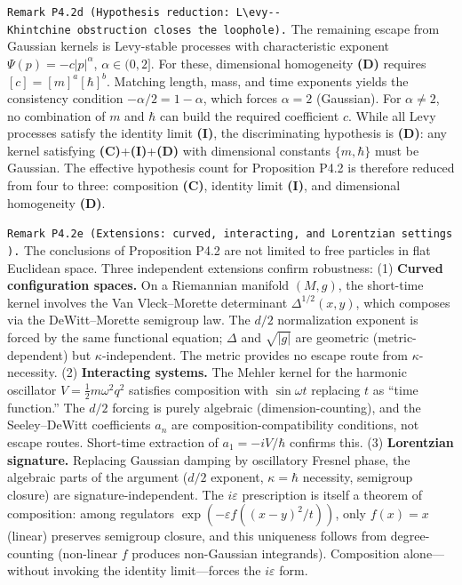 \documentclass[
]{article}
\begin{document}
\texttt{Remark\ P4.2d\ (Hypothesis\ reduction:\ L\textbackslash{}\textquotesingle{}evy-\/-Khintchine\ obstruction\ closes\ the\ loophole).}
The remaining escape from Gaussian kernels is
L\textquotesingle evy-stable processes with characteristic exponent
\(\Psi(p)=-c|p|^\alpha\), \(\alpha\in(0,2]\). For these, dimensional
homogeneity \textbf{(D)} requires \([c]=[m]^a[\hbar]^b\). Matching
length, mass, and time exponents yields the consistency condition
\(-\alpha/2=1-\alpha\), which forces \(\alpha=2\) (Gaussian). For
\(\alpha\neq 2\), no combination of \(m\) and \(\hbar\) can build the
required coefficient \(c\). While all L\textquotesingle evy processes
satisfy the identity limit \textbf{(I)}, the discriminating hypothesis
is \textbf{(D)}: any kernel satisfying
\textbf{(C)}+\textbf{(I)}+\textbf{(D)} with dimensional constants
\(\{m,\hbar\}\) must be Gaussian. The effective hypothesis count for
Proposition P4.2 is therefore reduced from four to three: composition
\textbf{(C)}, identity limit \textbf{(I)}, and dimensional homogeneity
\textbf{(D)}.

\texttt{Remark\ P4.2e\ (Extensions:\ curved,\ interacting,\ and\ Lorentzian\ settings).}
The conclusions of Proposition P4.2 are not limited to free particles in
flat Euclidean space. Three independent extensions confirm robustness:
(1) \textbf{Curved configuration spaces.} On a Riemannian manifold
\((M,g)\), the short-time kernel involves the Van Vleck--Morette
determinant \(\Delta^{1/2}(x,y)\), which composes via the
DeWitt--Morette semigroup law. The \(d/2\) normalization exponent is
forced by the same functional equation; \(\Delta\) and \(\sqrt{|g|}\)
are geometric (metric-dependent) but \(\kappa\)-independent. The metric
provides no escape route from \(\kappa\)-necessity. (2)
\textbf{Interacting systems.} The Mehler kernel for the harmonic
oscillator \(V=\tfrac{1}{2}m\omega^2 q^2\) satisfies composition with
\(\sin\omega t\) replacing \(t\) as ``time function.'' The \(d/2\)
forcing is purely algebraic (dimension-counting), and the Seeley--DeWitt
coefficients \(a_n\) are composition-compatibility conditions, not
escape routes. Short-time extraction of \(a_1=-iV/\hbar\) confirms this.
(3) \textbf{Lorentzian signature.} Replacing Gaussian damping by
oscillatory Fresnel phase, the algebraic parts of the argument (\(d/2\)
exponent, \(\kappa=\hbar\) necessity, semigroup closure) are
signature-independent. The \(i\varepsilon\) prescription is itself a
theorem of composition: among regulators
\(\exp(-\varepsilon f((x-y)^2/t))\), only \(f(x)=x\) (linear) preserves
semigroup closure, and this uniqueness follows from degree-counting
(non-linear \(f\) produces non-Gaussian integrands). Composition
alone---without invoking the identity limit---forces the
\(i\varepsilon\) form.
\end{document}
